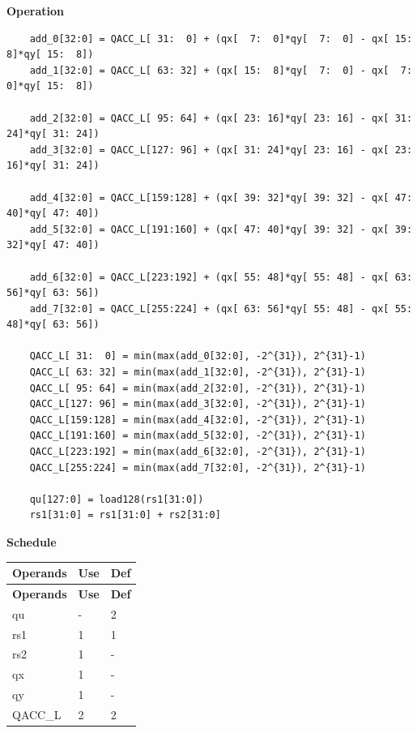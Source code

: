 \textbf{Operation}\\
\begin{lstlisting}
    add_0[32:0] = QACC_L[ 31:  0] + (qx[  7:  0]*qy[  7:  0] - qx[ 15:  8]*qy[ 15:  8])
    add_1[32:0] = QACC_L[ 63: 32] + (qx[ 15:  8]*qy[  7:  0] - qx[  7:  0]*qy[ 15:  8])

    add_2[32:0] = QACC_L[ 95: 64] + (qx[ 23: 16]*qy[ 23: 16] - qx[ 31: 24]*qy[ 31: 24])
    add_3[32:0] = QACC_L[127: 96] + (qx[ 31: 24]*qy[ 23: 16] - qx[ 23: 16]*qy[ 31: 24])

    add_4[32:0] = QACC_L[159:128] + (qx[ 39: 32]*qy[ 39: 32] - qx[ 47: 40]*qy[ 47: 40])
    add_5[32:0] = QACC_L[191:160] + (qx[ 47: 40]*qy[ 39: 32] - qx[ 39: 32]*qy[ 47: 40])

    add_6[32:0] = QACC_L[223:192] + (qx[ 55: 48]*qy[ 55: 48] - qx[ 63: 56]*qy[ 63: 56])
    add_7[32:0] = QACC_L[255:224] + (qx[ 63: 56]*qy[ 55: 48] - qx[ 55: 48]*qy[ 63: 56])

    QACC_L[ 31:  0] = min(max(add_0[32:0], -2^{31}), 2^{31}-1)
    QACC_L[ 63: 32] = min(max(add_1[32:0], -2^{31}), 2^{31}-1)
    QACC_L[ 95: 64] = min(max(add_2[32:0], -2^{31}), 2^{31}-1)
    QACC_L[127: 96] = min(max(add_3[32:0], -2^{31}), 2^{31}-1)
    QACC_L[159:128] = min(max(add_4[32:0], -2^{31}), 2^{31}-1)
    QACC_L[191:160] = min(max(add_5[32:0], -2^{31}), 2^{31}-1)
    QACC_L[223:192] = min(max(add_6[32:0], -2^{31}), 2^{31}-1)
    QACC_L[255:224] = min(max(add_7[32:0], -2^{31}), 2^{31}-1)

    qu[127:0] = load128(rs1[31:0])
    rs1[31:0] = rs1[31:0] + rs2[31:0]
\end{lstlisting}

\textbf{Schedule}\\
\begin{longtable}[c]{|l|l|l|}
    \hline
    \rowcolor{lightgray}
    \textbf{Operands} & \textbf{Use} & \textbf{Def} \\\hline
    \endfirsthead
    \hline
    \rowcolor{lightgray}
     \textbf{Operands} & \textbf{Use} & \textbf{Def} \\\hline
    \endhead
    \hline
    \endfoot

    qu & - & 2 \\\hline
    rs1 & 1 & 1 \\\hline
    rs2 & 1 & - \\\hline
     qx & 1 & - \\\hline
     qy & 1 & - \\\hline
     QACC\_L & 2 & 2

\end{longtable}

